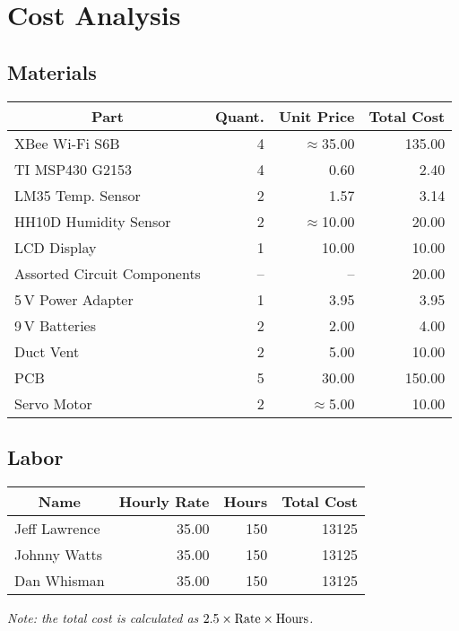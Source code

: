 \section{Cost Analysis}
\subsection{Materials}
\begin{center}
\begin{tabular}{|l|r|r||r|}
\hline
\multicolumn{1}{|c}{Part} & \multicolumn{1}{|c}{Quant.} & \multicolumn{1}{|c||}{Unit Price} & \multicolumn{1}{c|}{Total Cost}\\
\hline\hline
XBee Wi-Fi S6B          & 4 & $\approx$35.00  & 135.00 \\
\hline
TI MSP430 G2153         & 4 & 0.60            &   2.40 \\
\hline
LM35 Temp. Sensor       & 2 & 1.57            &   3.14 \\
\hline
HH10D Humidity Sensor   & 2 & $\approx$10.00  &  20.00 \\
\hline
LCD Display             & 1 & 10.00           &  10.00 \\
\hline
Assorted Circuit Components & -- & --         &  20.00 \\
\hline
5\,V Power Adapter      & 1 &  3.95           &   3.95 \\
\hline
9\,V Batteries          & 2 &  2.00           &  4.00 \\
\hline
Duct Vent               & 2 &  5.00           &  10.00\\
\hline
PCB                     & 5 &  30.00          & 150.00\\
\hline
Servo Motor             & 2 & $\approx$5.00   & 10.00 \\
\hline
\end{tabular}
\end{center}

\subsection{Labor}
\begin{center}
\begin{tabular}{|l|r|r||r|}
\hline
\multicolumn{1}{|c}{Name} & \multicolumn{1}{|c}{Hourly Rate} & \multicolumn{1}{|c||}{Hours} & \multicolumn{1}{c|}{Total Cost}\\
\hline\hline
Jeff Lawrence & 35.00 & 150 & 13125 \\
\hline
Johnny Watts  & 35.00 & 150 & 13125 \\
\hline
Dan Whisman   & 35.00 & 150 & 13125 \\
\hline
\end{tabular}

{\it Note: the total cost is calculated as $2.5\times {\rm Rate} \times {\rm Hours}$.}
\end{center}

